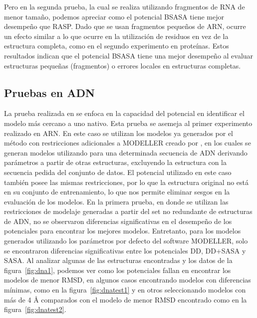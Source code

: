 \par
Pero en la segunda prueba, la cual se realiza utilizando fragmentos de RNA de menor tamaño, podemos apreciar como el potencial BSASA tiene mejor desempeño que RASP.
Dado que se usan fragmentos pequeños de ARN, ocurre un efecto similar a lo que ocurre en la utilización de residuos en vez de la estructura completa, como en el segundo experimento en proteínas.
Estos resultados indican que el potencial BSASA tiene una mejor desempeño al evaluar estructuras pequeñas (fragmentos) o errores locales en estructuras completas.

\subsection{Pruebas en ADN}
La prueba realizada en se enfoca en la capacidad del potencial en identificar el modelo más cercano a uno nativo. Esta prueba se asemeja al primer experimento realizado en ARN.
En este caso se utilizan los modelos ya generados por el método con restricciones adicionales a MODELLER creado por \cite{Ilibarra2013}, en los cuales se generan modelos utilizando para una determinada secuencia de ADN derivando parámetros a partir de otras estructuras, excluyendo la estructura con la secuencia pedida del conjunto de datos.
El potencial utilizado en este caso también posee las mismas restricciones, por lo que la estructura original no está en su conjunto de entrenamiento, lo que nos permite eliminar sesgos en la evaluación de los modelos.
En la primera prueba, en donde se utilizan las restricciones de modelaje generadas a partir del set no redundante de estructuras de ADN, no se observaron diferencias significativas en el desempeño de los potenciales para encontrar los mejores modelos. 
Entretanto, para los modelos generados utilizando los parámetros por defecto del software MODELLER, solo se encontraron diferencias significativas entre los potenciales DD, DD+SASA y SASA.
Al analizar algunas de las estructuras encontradas y los datos de la figura~\ref{fig:dna1}, podemos ver como los potenciales fallan en encontrar los modelos de menor RMSD, en algunos casos encontrando modelos con diferencias mínimas, como en la figura~\ref{fig:dnatest1} y en otros seleccionando modelos con más de 4 \si{\angstrom} comparados con el modelo de menor RMSD encontrado como en la figura~\ref{fig:dnatest2}.

